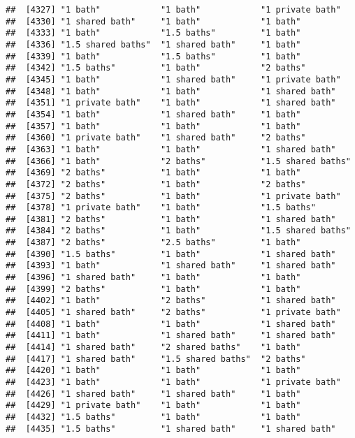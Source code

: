 \documentclass[
]{article}
\begin{document}
\begin{verbatim}
##  [4327] "1 bath"            "1 bath"            "1 private bath"   
##  [4330] "1 shared bath"     "1 bath"            "1 bath"           
##  [4333] "1 bath"            "1.5 baths"         "1 bath"           
##  [4336] "1.5 shared baths"  "1 shared bath"     "1 bath"           
##  [4339] "1 bath"            "1.5 baths"         "1 bath"           
##  [4342] "1.5 baths"         "1 bath"            "2 baths"          
##  [4345] "1 bath"            "1 shared bath"     "1 private bath"   
##  [4348] "1 bath"            "1 bath"            "1 shared bath"    
##  [4351] "1 private bath"    "1 bath"            "1 shared bath"    
##  [4354] "1 bath"            "1 shared bath"     "1 bath"           
##  [4357] "1 bath"            "1 bath"            "1 bath"           
##  [4360] "1 private bath"    "1 shared bath"     "2 baths"          
##  [4363] "1 bath"            "1 bath"            "1 shared bath"    
##  [4366] "1 bath"            "2 baths"           "1.5 shared baths" 
##  [4369] "2 baths"           "1 bath"            "1 bath"           
##  [4372] "2 baths"           "1 bath"            "2 baths"          
##  [4375] "2 baths"           "1 bath"            "1 private bath"   
##  [4378] "1 private bath"    "1 bath"            "1.5 baths"        
##  [4381] "2 baths"           "1 bath"            "1 shared bath"    
##  [4384] "2 baths"           "1 bath"            "1.5 shared baths" 
##  [4387] "2 baths"           "2.5 baths"         "1 bath"           
##  [4390] "1.5 baths"         "1 bath"            "1 shared bath"    
##  [4393] "1 bath"            "1 shared bath"     "1 shared bath"    
##  [4396] "1 shared bath"     "1 bath"            "1 bath"           
##  [4399] "2 baths"           "1 bath"            "1 bath"           
##  [4402] "1 bath"            "2 baths"           "1 shared bath"    
##  [4405] "1 shared bath"     "2 baths"           "1 private bath"   
##  [4408] "1 bath"            "1 bath"            "1 shared bath"    
##  [4411] "1 bath"            "1 shared bath"     "1 shared bath"    
##  [4414] "1 shared bath"     "2 shared baths"    "1 bath"           
##  [4417] "1 shared bath"     "1.5 shared baths"  "2 baths"          
##  [4420] "1 bath"            "1 bath"            "1 bath"           
##  [4423] "1 bath"            "1 bath"            "1 private bath"   
##  [4426] "1 shared bath"     "1 shared bath"     "1 bath"           
##  [4429] "1 private bath"    "1 bath"            "1 bath"           
##  [4432] "1.5 baths"         "1 bath"            "1 bath"           
##  [4435] "1.5 baths"         "1 shared bath"     "1 shared bath"    

\end{verbatim}
\end{document}
